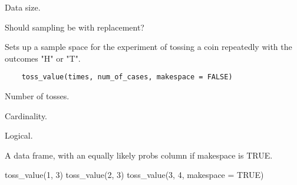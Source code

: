 \documentclass[letterpaper]{book}
\begin{document}
%
\begin{Arguments}
\begin{ldescription}
\item[\code{n}]  Data size. 
\item[\code{rep}]  Should sampling be with replacement? 
\end{ldescription}
\end{Arguments}
%
\begin{Description}\relax
Sets up a sample space for the experiment of tossing a coin repeatedly with the outcomes "H" or "T".
\end{Description}
%
\begin{Usage}
\begin{verbatim}
	toss_value(times, num_of_cases, makespace = FALSE)
\end{verbatim}
\end{Usage}
%
\begin{Arguments}
\begin{ldescription}
\item[\code{times}]  Number of tosses. 
\item[\code{num\_of\_cases}]  Cardinality. 
\item[\code{makespace}]  Logical. 
\end{ldescription}
\end{Arguments}
%
\begin{Value}
A data frame, with an equally likely probs column if makespace is TRUE.
\end{Value}
%
\begin{Examples}
\begin{ExampleCode}
	toss_value(1, 3)
	toss_value(2, 3)
	toss_value(3, 4, makespace = TRUE)
\end{ExampleCode}
\end{Examples}
\printindex{}
\end{document}
